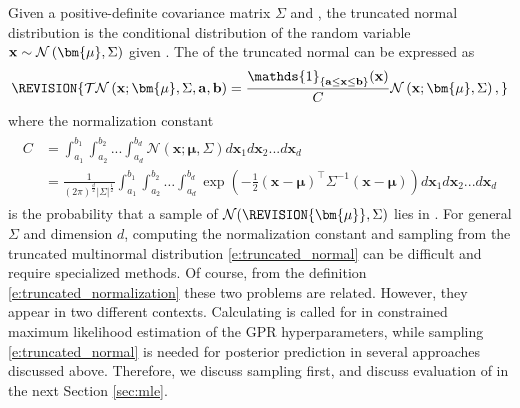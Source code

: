 \label{sec:mvn}
Given a positive-definite covariance matrix $\Sigma$ and , the truncated normal distribution is the conditional distribution of the random variable $\bold{x} \sim \mathcal{N}\left(\bm{\mu},  \Sigma\right)$ given . The  of the truncated normal can be expressed as
\begin{equation}\label{e:truncated_normal}
\REVISION{\mathcal{TN}\left(\bold{x}; \bm{\mu},  \Sigma, \mathbf{a}, \mathbf{b} \right)
=
\frac{\mathds{1}_{\{\mathbf{a} \le \mathbf{x} \le \mathbf{b}\}}(\bold{x})}{C}
\mathcal{N}\left(\bold{x}; \bm{\mu},  \Sigma \right),}
\end{equation}
where the normalization constant
\begin{align}\label{e:truncated_normalization}
\begin{split}
C
&=
\int_{a_1}^{b_1}
\int_{a_2}^{b_2}
...
\int_{a_d}^{b_d}
\mathcal{N}\left(\mathbf{x}; \bm{\mu},  \Sigma\right)
d\mathbf{x}_1
d\mathbf{x}_2
...
d\mathbf{x}_d\\
&=
\frac{1}{(2\pi)^{\frac{d}{2}}|\Sigma|^{\frac{1}{2}}}
\int_{a_1}^{b_1}
\int_{a_2}^{b_2}
\hdots
\int_{a_d}^{b_d}
\exp\left({-\frac{1}{2} (\mathbf{x} - \bm{\mu})^\top \Sigma^{-1} (\mathbf{x} - \bm{\mu})}\right)
d\mathbf{x}_1
d\mathbf{x}_2
...
d\mathbf{x}_d
\end{split}
\end{align}
is the probability that a sample of $\mathcal{N}(\REVISION{\bm{\mu}}, \Sigma)$ lies in . 
For general $\Sigma$ and dimension $d$, computing the normalization constant and sampling from the truncated multinormal distribution 
\eqref{e:truncated_normal} can be difficult and require specialized methods. Of course, from the definition \eqref{e:truncated_normalization} these two problems are related. However, they appear in two different contexts. Calculating  is called for in constrained maximum likelihood estimation of the GPR hyperparameters, while sampling \eqref{e:truncated_normal} is needed for posterior prediction in several approaches discussed above. Therefore, we discuss sampling first, and discuss evaluation of  in the next Section \ref{sec:mle}. 

